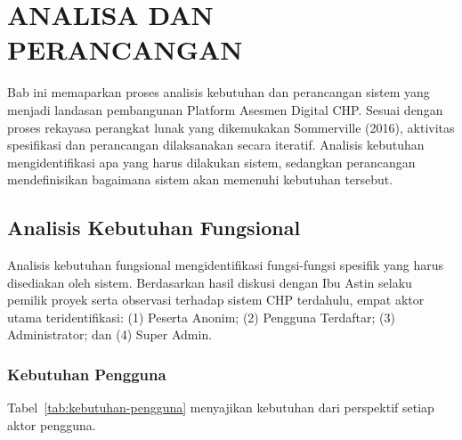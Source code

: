 \chapter{ANALISA DAN PERANCANGAN}
\label{chap:analisa-perancangan}

Bab ini memaparkan proses analisis kebutuhan dan perancangan sistem yang menjadi landasan pembangunan Platform Asesmen Digital CHP. Sesuai dengan proses rekayasa perangkat lunak yang dikemukakan Sommerville (2016), aktivitas spesifikasi dan perancangan dilaksanakan secara iteratif. Analisis kebutuhan mengidentifikasi apa yang harus dilakukan sistem, sedangkan perancangan mendefinisikan bagaimana sistem akan memenuhi kebutuhan tersebut.

\section{Analisis Kebutuhan Fungsional}
\label{sec:kebutuhan-fungsional}

Analisis kebutuhan fungsional mengidentifikasi fungsi-fungsi spesifik yang harus disediakan oleh sistem. Berdasarkan hasil diskusi dengan Ibu Astin selaku pemilik proyek serta observasi terhadap sistem CHP terdahulu, empat aktor utama teridentifikasi: (1) Peserta Anonim; (2) Pengguna Terdaftar; (3) Administrator; dan (4) Super Admin.

\subsection{Kebutuhan Pengguna}

Tabel~\ref{tab:kebutuhan-pengguna} menyajikan kebutuhan dari perspektif setiap aktor pengguna.

